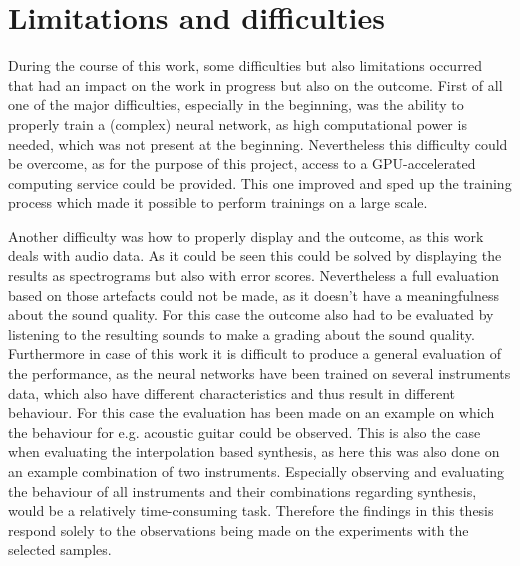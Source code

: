 \section{Limitations and difficulties}
During the course of this work, some difficulties but also limitations occurred that had an impact on the work in progress but also on the outcome. First of all one of the major difficulties, especially in the beginning, was the ability to properly train a (complex) neural network, as high computational power is needed, which was not present at the beginning. Nevertheless this difficulty could be overcome, as for the purpose of this project, access to a GPU-accelerated computing service could be provided. This one improved and sped up the training process which made it possible to perform trainings on a large scale.

Another difficulty was how to properly display and the outcome, as this work deals with audio data. As it could be seen this could be solved by displaying the results as spectrograms but also with error scores. Nevertheless a full evaluation based on those artefacts could not be made, as it doesn't have a meaningfulness about the sound quality. For this case the outcome also had to be evaluated by listening to the resulting sounds to make a grading about the sound quality. Furthermore in case of this work it is difficult to produce a general evaluation of the performance, as the neural networks have been trained on several instruments data, which also have different characteristics and thus result in different behaviour. For this case the evaluation has been made on an example on which the behaviour for e.g. acoustic guitar could be observed. This is also the case when evaluating the interpolation based synthesis, as here this was also done on an example combination of two instruments. Especially observing and evaluating the behaviour of all instruments and their combinations regarding synthesis, would be a relatively time-consuming task. Therefore the findings in this thesis respond solely to the observations being made on the experiments with the selected samples. 

